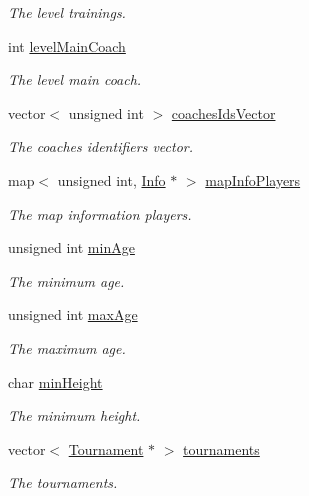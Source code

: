 \begin{DoxyCompactItemize}
\begin{DoxyCompactList}\small\item\em The level trainings. \end{DoxyCompactList}\item 
int \hyperlink{class_level_af7943487f1cf311dfa00400037da1f3d}{level\+Main\+Coach}
\begin{DoxyCompactList}\small\item\em The level main coach. \end{DoxyCompactList}\item 
vector$<$ unsigned int $>$ \hyperlink{class_level_a2244ded7cbc3e261c400042dcd1f765f}{coaches\+Ids\+Vector}
\begin{DoxyCompactList}\small\item\em The coaches identifiers vector. \end{DoxyCompactList}\item 
map$<$ unsigned int, \hyperlink{class_info}{Info} $\ast$ $>$ \hyperlink{class_level_aea430b89c484e79aebe7f23852ce998c}{map\+Info\+Players}
\begin{DoxyCompactList}\small\item\em The map information players. \end{DoxyCompactList}\item 
unsigned int \hyperlink{class_level_a3ab82616194caca77f24c568c4151a19}{min\+Age}
\begin{DoxyCompactList}\small\item\em The minimum age. \end{DoxyCompactList}\item 
unsigned int \hyperlink{class_level_a009aecf3fb4c0b553680d9e66385a8e2}{max\+Age}
\begin{DoxyCompactList}\small\item\em The maximum age. \end{DoxyCompactList}\item 
char \hyperlink{class_level_a94edfb0b68503e60c1d79163c2cc1861}{min\+Height}
\begin{DoxyCompactList}\small\item\em The minimum height. \end{DoxyCompactList}\item 
vector$<$ \hyperlink{class_tournament}{Tournament} $\ast$ $>$ \hyperlink{class_level_ad6c327fa0c1fc11c38bc167de8e92476}{tournaments}
\begin{DoxyCompactList}\small\item\em The tournaments. \end{DoxyCompactList}\end{DoxyCompactItemize}


